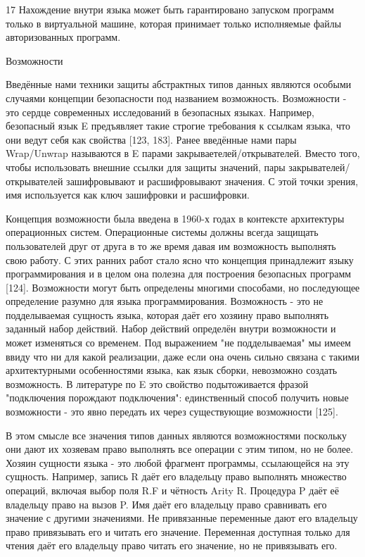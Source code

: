 17 Нахождение внутри языка может быть гарантировано запуском программ только в виртуальной машине, которая принимает только исполняемые файлы авторизованных программ.

Возможности

Введённые нами техники защиты абстрактных типов данных являются особыми случаями концепции безопасности под названием возможность. Возможности - это сердце современных исследований в безопасных языках. Например, безопасный язык E предъявляет такие строгие требования к ссылкам языка, что они ведут себя как свойства [123, 183]. Ранее введённые нами пары Wrap/Unwrap называются в E парами закрываетелей/открывателей. Вместо того, чтобы использовать внешние ссылки для защиты значений, пары закрывателей/открывателей зашифровывают и расшифровывают значения. С этой точки зрения, имя используется как ключ зашифровки и расшифровки.

Концепция возможности была введена в 1960-х годах в контексте архитектуры операционных систем. Операционные системы должны всегда защищать пользователей друг от друга в то же время давая им возможность выполнять свою работу. С этих ранних работ стало ясно что концепция принадлежит языку программирования и в целом она полезна для построения безопасных программ [124]. Возможности могут быть определены многими способами, но последующее определение разумно для языка программирования. Возможность - это не подделываемая сущность языка, которая даёт его хозяину право выполнять заданный набор действий. Набор действий определён внутри возможности и может изменяться со временем. Под выражением "не подделываемая" мы имеем ввиду что ни для какой реализации, даже если она очень сильно связана с такими архитектурными особенностями языка, как язык сборки, невозможно создать возможность. В литературе по E это свойство подытоживается фразой "подключения порождают подключения": единственный способ получить новые возможности - это явно передать их через существующие возможности [125].

В этом смысле все значения типов данных являются возможностями поскольку они дают их хозяевам право выполнять все операции с этим типом, но не более. Хозяин сущности языка - это любой фрагмент программы, ссылающейся на эту сущность. Например, запись R даёт его владельцу право выполнять множество операций, включая выбор поля R.F и чётность {Arity R}. Процедура P даёт её владельцу право на вызов P. Имя даёт его владельцу право сравнивать его значение с другими значениями. Не привязанные переменные дают его владельцу право привязывать его и читать его значение. Переменная доступная только для чтения даёт его владельцу право читать его значение, но не привязывать его.

